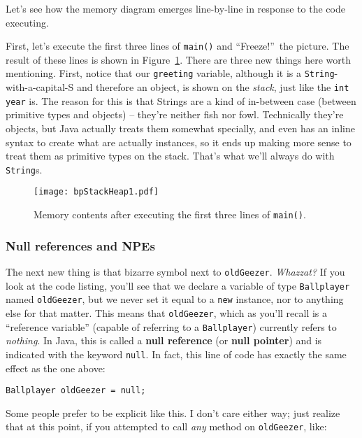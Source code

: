 Let's see how the memory diagram emerges line-by-line in response to the code
executing.

First, let's execute the first three lines of \texttt{main()} and
``Freeze!''\ the picture. The result of these lines is shown in
Figure~\ref{fig:bpStackHeap1}. There are three new things here worth
mentioning. First, notice that our \texttt{greeting} variable, although it is
a \texttt{String}-with-a-capital-S and therefore an object, is shown on the
\textit{stack}, just like the \texttt{int year} is. The reason for this is
that Strings are a kind of in-between case (between primitive types and
objects) -- they're neither fish nor fowl. Technically they're objects, but
Java actually treats them somewhat specially, and even has an inline syntax to
create what are actually instances, so it ends up making more sense to treat
them as primitive types on the stack. That's what we'll always do with
\texttt{String}s.

\begin{figure}   %
\centering
\texttt{[image: bpStackHeap1.pdf]}
\caption{Memory contents after executing the first three lines of
\texttt{main()}.}
\label{fig:bpStackHeap1}
\end{figure}

\subsubsection{Null references and NPEs}

The next new thing is that bizarre symbol next to \texttt{oldGeezer}.
\textit{Whazzat?} If you look at the code listing, you'll see that we
declare a variable of type \texttt{Ballplayer} named \texttt{oldGeezer}, but
we never set it equal to a \texttt{new} instance, nor to anything else for
that matter. This means that \texttt{oldGeezer}, which as you'll recall is a
``reference variable'' (capable of referring to a \texttt{Ballplayer})
currently refers to \textit{nothing}. In Java, this is called a \textbf{null
reference} (or \textbf{null pointer}) and is indicated with the keyword
\texttt{null}. In fact, this line of code has exactly the same effect as the
one above:

\begin{Verbatim}[fontsize=\small,samepage=true]
    Ballplayer oldGeezer = null;
\end{Verbatim}

Some people prefer to be explicit like this. I don't care either way; just
realize that at this point, if you attempted to call \textit{any} method on
\texttt{oldGeezer}, like:


